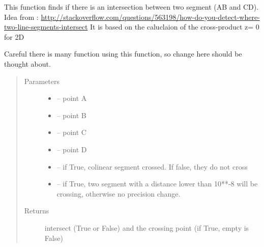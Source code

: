 \documentclass[letterpaper,10pt,english]{sphinxmanual}
\begin{document}
\begin{fulllineitems}
\label{\detokenize{index:src.manage_grid_8.intersection_seg}}
This function finds if there is an intersection between two segment (AB and CD). Idea from :
\url{http://stackoverflow.com/questions/563198/how-do-you-detect-where-two-line-segments-intersect}
It is based on the caluclaion of the cross-product z= 0 for 2D

Careful there is many function using this function, so change here should be thought about.
\begin{quote}\begin{description}
\item[{Parameters}] \leavevmode\begin{itemize}
\item {} 
 -- point A

\item {} 
 -- point B

\item {} 
 -- point C

\item {} 
 -- point D

\item {} 
 -- if True, colinear segment crossed. If false, they do not cross

\item {} 
 -- if True, two segment with a distance lower than 10**-8 will be crossing, otherwise no precision change.

\end{itemize}

\item[{Returns}] \leavevmode
intersect (True or False) and the crossing point (if True, empty is False)

\end{description}\end{quote}

\end{fulllineitems}

\end{document}
